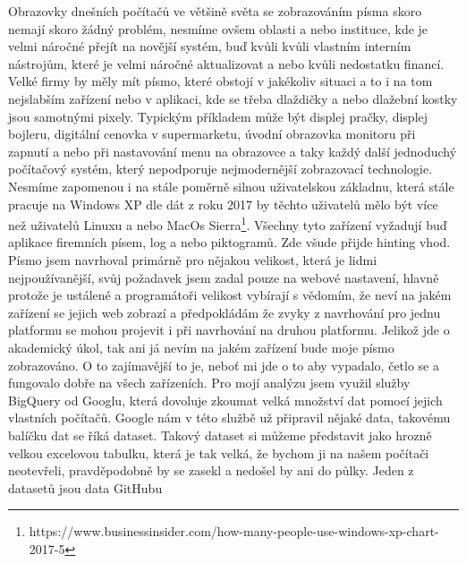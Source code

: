 \documentclass[a4paper]{article}
\begin{document}
Obrazovky dnešních počítačů ve většině světa se zobrazováním písma skoro nemají skoro žádný problém, nesmíme ovšem oblasti a nebo instituce, kde je velmi náročné přejít na novější systém, buď kvůli kvůli vlastním interním nástrojům, které je velmi náročné aktualizovat a nebo kvůli nedostatku financí. Velké firmy by měly mít písmo, které obstojí v jakékoliv situaci a to i na tom nejslabším zařízení nebo v aplikaci, kde se třeba dlaždičky a nebo dlažební kostky jsou samotnými pixely. Typickým příkladem může být displej pračky, displej bojleru, digitální cenovka v supermarketu, úvodní obrazovka monitoru při zapnutí a nebo při nastavování menu na obrazovce a taky každý další jednoduchý počítačový systém, který nepodporuje nejmodernější zobrazovací technologie. Nesmíme zapomenou i na stále poměrně silnou uživatelskou základnu, která stále pracuje na Windows XP dle dát z roku 2017 by těchto uživatelů mělo být více než uživatelů Linuxu a nebo MacOs Sierra\footnote{https://www.businessinsider.com/how-many-people-use-windows-xp-chart-2017-5}. Všechny tyto zařízení vyžadují buď aplikace firemních písem, log a nebo piktogramů. Zde všude přijde hinting vhod. Písmo jsem navrhoval primárně pro nějakou velikost, která je lidmi nejpoužívanější, svůj požadavek jsem zadal pouze na webové nastavení, hlavně protože je ustálené a programátoři velikost vybírají s vědomím, že neví na jakém zařízení se jejich web zobrazí a předpokládám že zvyky z navrhování pro jednu platformu se mohou projevit i při navrhování na druhou platformu. Jelikož jde o akademický úkol, tak ani já nevím na jakém zařízení bude moje písmo zobrazováno. O to zajímavější to je, neboť mi jde o to aby vypadalo, četlo se a fungovalo dobře na všech zařízeních. Pro mojí analýzu jsem využil služby BigQuery od Googlu, která dovoluje zkoumat velká množství dat pomocí jejich vlastních počítačů. Google nám v této službě už připravil nějaké data, takovému balíčku dat se říká dataset. Takový dataset si můžeme představit jako hrozně velkou excelovou tabulku, která je tak velká, že bychom ji na našem počítači neotevřeli, pravděpodobně by se zasekl a nedošel by ani do půlky. Jeden z datasetů jsou data GitHubu
\end{document}
